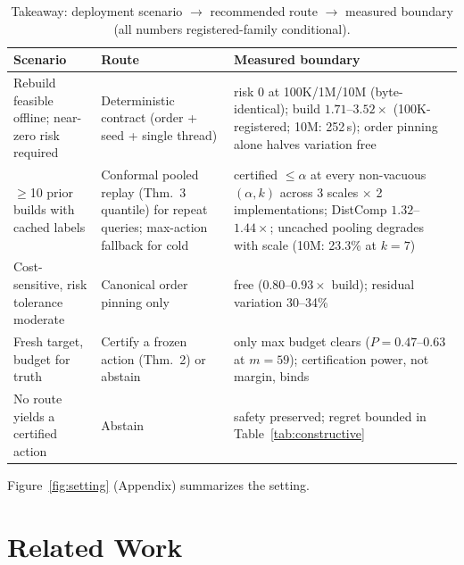 \documentclass{article}
\begin{document}
\begin{table}[t]
\centering
\caption{Takeaway: deployment scenario $\rightarrow$ recommended route $\rightarrow$ measured boundary (all numbers registered-family conditional).}
\label{tab:takeaway}
\footnotesize
\setlength{\tabcolsep}{3pt}
\begin{tabular}{p{3.2cm}p{3.9cm}p{6.5cm}}
\toprule
Scenario & Route & Measured boundary \\
\midrule
Rebuild feasible offline; near-zero risk required & Deterministic contract (order + seed + single thread) & risk 0 at 100K/1M/10M (byte-identical); build $1.71$--$3.52\times$ (100K-registered; 10M: 252\,s); order pinning alone halves variation free \\
$\ge$10 prior builds with cached labels & Conformal pooled replay (Thm.~3 quantile) for repeat queries; max-action fallback for cold & certified $\le\alpha$ at every non-vacuous $(\alpha,k)$ across 3 scales $\times$ 2 implementations; DistComp $1.32$--$1.44\times$; uncached pooling degrades with scale (10M: 23.3\% at $k{=}7$) \\
Cost-sensitive, risk tolerance moderate & Canonical order pinning only & free ($0.80$--$0.93\times$ build); residual variation 30--34\% \\
Fresh target, budget for truth & Certify a frozen action (Thm.~2) or abstain & only max budget clears ($P{=}0.47$--$0.63$ at $m{=}59$); certification power, not margin, binds \\
No route yields a certified action & Abstain & safety preserved; regret bounded in Table~\ref{tab:constructive} \\
\bottomrule
\end{tabular}
\end{table}


Figure~\ref{fig:setting} (Appendix) summarizes the setting.

\section{Related Work}
\label{sec:related}
\end{document}
